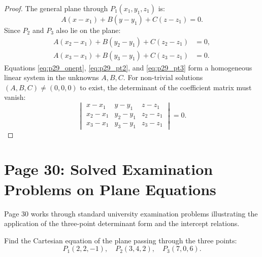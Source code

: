 \begin{proof}
The general plane through $P_1(x_1, y_1, z_1)$ is:
\begin{equation}
    A(x - x_1) + B(y - y_1) + C(z - z_1) = 0. \label{eq:p29_onept}
\end{equation}
Since $P_2$ and $P_3$ also lie on the plane:
\begin{align}
    A(x_2 - x_1) + B(y_2 - y_1) + C(z_2 - z_1) &= 0, \label{eq:p29_pt2} \\
    A(x_3 - x_1) + B(y_3 - y_1) + C(z_3 - z_1) &= 0. \label{eq:p29_pt3}
\end{align}
Equations \eqref{eq:p29_onept}, \eqref{eq:p29_pt2}, and \eqref{eq:p29_pt3} form a homogeneous linear system in the unknowns $A, B, C$.
For non-trivial solutions $(A, B, C) \neq (0, 0, 0)$ to exist, the determinant of the coefficient matrix must vanish:
\begin{equation}
    \begin{vmatrix}
    x - x_1 & y - y_1 & z - z_1 \\
    x_2 - x_1 & y_2 - y_1 & z_2 - z_1 \\
    x_3 - x_1 & y_3 - y_1 & z_3 - z_1
    \end{vmatrix} = 0.
\end{equation}
\end{proof}

\section{Page 30: Solved Examination Problems on Plane Equations}
\label{sec:page30}

\begin{conceptbox}
Page 30 works through standard university examination problems illustrating the application of the three-point determinant form and the intercept relations.
\end{conceptbox}

\begin{examplebox}
Find the Cartesian equation of the plane passing through the three points:
\begin{equation}
    P_1(2, 2, -1), \quad P_2(3, 4, 2), \quad P_3(7, 0, 6).
\end{equation}
\end{examplebox}


